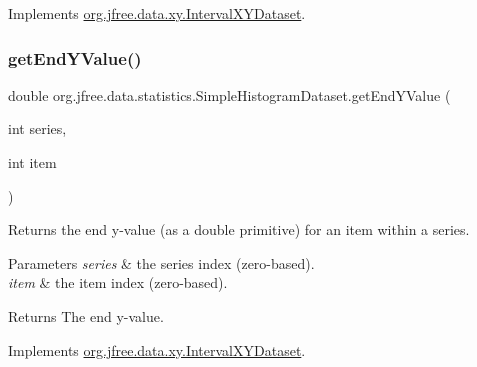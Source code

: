 Implements \mbox{\hyperlink{interfaceorg_1_1jfree_1_1data_1_1xy_1_1_interval_x_y_dataset_ae938af574bad07e7f47a8b423223ef9b}{org.\+jfree.\+data.\+xy.\+Interval\+X\+Y\+Dataset}}.

\mbox{\label{classorg_1_1jfree_1_1data_1_1statistics_1_1_simple_histogram_dataset_af8a27ec1e56f24f0530bc724c58ac2e5}} 
\subsubsection{\texorpdfstring{get\+End\+Y\+Value()}{getEndYValue()}}
{\footnotesize\ttfamily double org.\+jfree.\+data.\+statistics.\+Simple\+Histogram\+Dataset.\+get\+End\+Y\+Value (\begin{DoxyParamCaption}\item[{int}]{series,  }\item[{int}]{item }\end{DoxyParamCaption})}

Returns the end y-\/value (as a double primitive) for an item within a series.


\begin{DoxyParams}{Parameters}
{\em series} & the series index (zero-\/based). \\
\hline
{\em item} & the item index (zero-\/based).\\
\hline
\end{DoxyParams}
\begin{DoxyReturn}{Returns}
The end y-\/value. 
\end{DoxyReturn}


Implements \mbox{\hyperlink{interfaceorg_1_1jfree_1_1data_1_1xy_1_1_interval_x_y_dataset_a0538ada774aad34ec95edbb84c1a82e1}{org.\+jfree.\+data.\+xy.\+Interval\+X\+Y\+Dataset}}.

\mbox{\label{classorg_1_1jfree_1_1data_1_1statistics_1_1_simple_histogram_dataset_a3de03f4cbb147a93230850fce30da30f}} 
